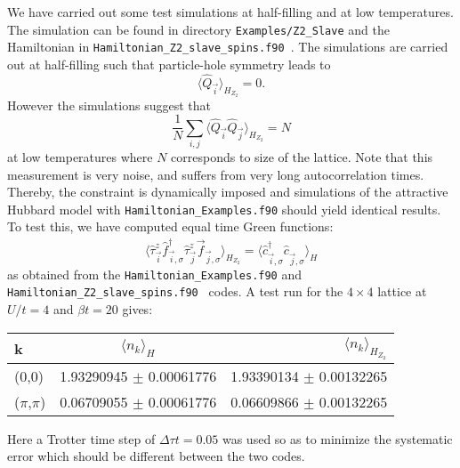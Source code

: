  We have carried out some test simulations at half-filling and at low temperatures.  The simulation can be found in directory \texttt{Examples/Z2\_Slave} and the  Hamiltonian in \texttt{Hamiltonian\_Z2\_slave\_spins.f90 }.  The simulations  are carried out at half-filling such that particle-hole symmetry leads to 
 \begin{equation}
 \langle \hat{Q}_{\vec{i}}    \rangle_{H_{Z_2}} =0.
 \end{equation} 
However the simulations suggest that 
 \begin{equation}
 \frac{1}{N}\sum_{i,j} \langle \hat{Q}_{\vec{i}}   \hat{Q}_{\vec{j}} \rangle_{H_{Z_2}}  = N 
 \end{equation} 
 at low temperatures  where  $N$  corresponds  to size of the lattice.  Note that this measurement is very noise, and suffers from very long autocorrelation times.  Thereby, the constraint is dynamically imposed and   simulations of the attractive Hubbard model with  \texttt{Hamiltonian\_Examples.f90}  should yield identical results. To test this,  we have computed equal time Green functions:
\begin{equation}
\langle  \hat{\tau}^{z}_{\vec{i}} \hat{f}^{\dagger}_{\vec{i},\sigma} \hat{\tau}^{z}_{\vec{j}} \vec{f}^{\phantom{\dagger}}_{\vec{j},\sigma} \rangle_{H_{Z_2}} = 
\langle  \hat{c}^{\dagger}_{\vec{i},\sigma} \hat{c}^{\phantom{\dagger}}_{\vec{j},\sigma} \rangle_{H} 
\end{equation}
as obtained  from  the \texttt{Hamiltonian\_Examples.f90} and    \texttt{Hamiltonian\_Z2\_slave\_spins.f90 } codes.  
A test run for the $4\times 4 $ lattice at $U/t = 4$ and $\beta t = 20$ gives: 
\begin{center}
\begin{tabular}{ l | c | r }
 \hline			
   k   &  $\langle n_k \rangle_{H} $  &  $\langle n_k \rangle_{H_{Z_2}} $ \\
  \hline
   (0,0)    & 1.93290945    $\pm$      0.00061776 &  1.93390134   $\pm$      0.00132265\\
   ($\pi$,$\pi$) & 0.06709055    $\pm$      0.00061776 &  0.06609866     $\pm$     0.00132265 \\
  \hline  
\end{tabular}

\end{center} 
\vspace*{0.5cm}
Here a Trotter time step of  $\Delta \tau t = 0.05$ was used  so as to minimize the systematic error   which should be different  between the two codes. 
